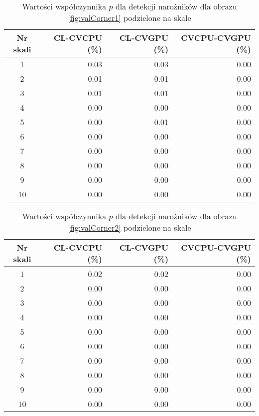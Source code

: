 \begin{center}
\begin{table}
\centering
\centering
\caption{Wartości współczynnika $ p $ dla detekcji narożników dla obrazu \ref{fig:valCorner1} podzielone na skale}
\label{tab:imageScaleCorner1}
\begin{tabular}{|c|r|r|r|}
 \hline
Nr skali & CL-CVCPU (\%) & CL-CVGPU (\%) & CVCPU-CVGPU (\%) \\ \hline
1        & 0.03     & 0.03     & 0.00        \\ \hline
2        & 0.01     & 0.01     & 0.00        \\ \hline
3        & 0.01     & 0.01     & 0.00        \\ \hline
4        & 0.00     & 0.00     & 0.00        \\ \hline
5        & 0.00     & 0.01     & 0.00        \\ \hline
6        & 0.00     & 0.00     & 0.00        \\ \hline
7        & 0.00     & 0.00     & 0.00        \\ \hline
8        & 0.00     & 0.00     & 0.00        \\ \hline
9        & 0.00     & 0.00     & 0.00        \\ \hline
10       & 0.00     & 0.00     & 0.00        \\ \hline
\end{tabular}
\end{table}
\end{center}

\begin{center}
\begin{table}
\centering
\centering
\caption{Wartości współczynnika $ p $ dla detekcji narożników dla obrazu \ref{fig:valCorner2} podzielone na skale}
\label{tab:imageScaleCorner2}
\begin{tabular}{|c|r|r|r|}
 \hline
Nr skali & CL-CVCPU (\%) & CL-CVGPU (\%) & CVCPU-CVGPU (\%) \\ \hline
1        & 0.02     & 0.02     & 0.00        \\ \hline
2        & 0.00     & 0.00     & 0.00        \\ \hline
3        & 0.00     & 0.00     & 0.00        \\ \hline
4        & 0.00     & 0.00     & 0.00        \\ \hline
5        & 0.00     & 0.00     & 0.00        \\ \hline
6        & 0.00     & 0.00     & 0.00        \\ \hline
7        & 0.00     & 0.00     & 0.00        \\ \hline
8        & 0.00     & 0.00     & 0.00        \\ \hline
9        & 0.00     & 0.00     & 0.00        \\ \hline
10       & 0.00     & 0.00     & 0.00        \\ \hline
\end{tabular}
\end{table}
\end{center}

